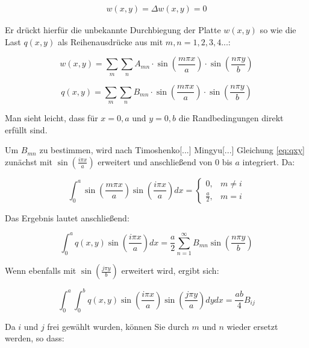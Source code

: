 \begin{align}
 \tag{x = 0,a \quad y = 0,b}w(x,y) = \Delta w(x,y) = 0	
\end{align}

Er drückt hierfür die unbekannte Durchbiegung der Platte $w(x,y)$ so wie die Last $q(x,y)$ als Reihenausdrücke aus mit $m,n = 1,2,3,4...$:

\begin{equation} 
w(x,y) = \sum_m \sum_n A_{mn} \cdot \sin\left(\dfrac{m \pi x}{a}\right) \cdot \sin\left(\dfrac{n \pi y}{b}\right)
\label{eq:wxy}
\end{equation} 

\begin{equation} 
q(x,y) = \sum_m \sum_n B_{mn} \cdot \sin\left(\dfrac{m \pi x}{a}\right) \cdot \sin\left(\dfrac{n \pi y}{b}\right)
\label{eq:qxy}
\end{equation} 

Man sieht leicht, dass für $x=0,a$ und $y=0,b$ die Randbedingungen direkt erfüllt sind.

Um $B_{mn}$ zu bestimmen, wird nach Timoshenko[...] Mingyu[...] Gleichung \ref{eq:qxy} zunächst mit $\sin{\left( \frac{i \pi x}{a}\right)}$ erweitert und anschließend von $0$ bis $a$ integriert. Da:

\begin{equation}
	\int_0^a \sin{\left( \frac{m \pi x}{a}\right)} \sin{\left( \frac{i \pi x}{a}\right)} dx = 
	\begin{cases}
	0,&  m\neq i\\
	\frac{a}{2},&   m = i 
	\end{cases}
\end{equation}

Das Ergebnis lautet anschließend:

\begin{equation}
	\int_0^a q(x,y) \sin{\left( \frac{i \pi x}{a}\right)} dx = \frac{a}{2} \sum_{n=1}^\infty B_{mn} \sin{\left( \frac{n \pi y}{b}\right)}
\end{equation}

Wenn ebenfalls mit $\sin{\left( \frac{j \pi y}{b}\right)}$ erweitert wird, ergibt sich:


\begin{equation}
\int_0^a \int_0^b q(x,y) \sin{\left( \frac{i \pi x}{a}\right)} \sin{\left( \frac{j \pi y}{a}\right)} dy dx = \frac{ab}{4}  B_{ij} 
\end{equation}


Da $i$ und $j$ frei gewählt wurden, können Sie durch $m$ und $n$ wieder ersetzt werden, so dass:


